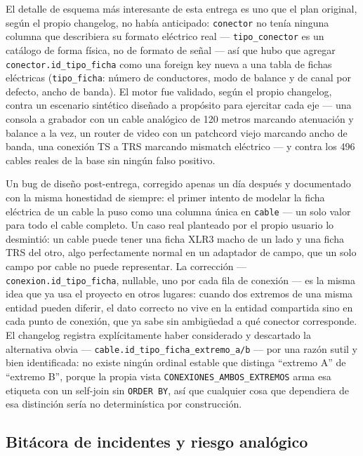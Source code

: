 \documentclass[11pt,twocolumn]{article}
\begin{document}
El detalle de esquema más interesante de esta entrega es uno que el plan original, según el propio changelog, no había anticipado: \texttt{conector} no tenía ninguna columna que describiera su formato eléctrico real --- \texttt{tipo\_conector} es un catálogo de forma física, no de formato de señal --- así que hubo que agregar \texttt{conector.id\_tipo\_ficha} como una foreign key nueva a una tabla de fichas eléctricas (\texttt{tipo\_ficha}: número de conductores, modo de balance y de canal por defecto, ancho de banda). El motor fue validado, según el propio changelog, contra un escenario sintético diseñado a propósito para ejercitar cada eje --- una consola a grabador con un cable analógico de 120 metros marcando atenuación y balance a la vez, un router de video con un patchcord viejo marcando ancho de banda, una conexión TS a TRS marcando mismatch eléctrico --- y contra los 496 cables reales de la base sin ningún falso positivo.

Un bug de diseño post-entrega, corregido apenas un día después y documentado con la misma honestidad de siempre: el primer intento de modelar la ficha eléctrica de un cable la puso como una columna única en \texttt{cable} --- un solo valor para todo el cable completo. Un caso real planteado por el propio usuario lo desmintió: un cable puede tener una ficha XLR3 macho de un lado y una ficha TRS del otro, algo perfectamente normal en un adaptador de campo, que un solo campo por cable no puede representar. La corrección --- \texttt{conexion.id\_tipo\_ficha}, nullable, uno por cada fila de conexión --- es la misma idea que ya usa el proyecto en otros lugares: cuando dos extremos de una misma entidad pueden diferir, el dato correcto no vive en la entidad compartida sino en cada punto de conexión, que ya sabe sin ambigüedad a qué conector corresponde. El changelog registra explícitamente haber considerado y descartado la alternativa obvia --- \texttt{cable.id\_tipo\_ficha\_extremo\_a/b} --- por una razón sutil y bien identificada: no existe ningún ordinal estable que distinga ``extremo A'' de ``extremo B'', porque la propia vista \texttt{CONEXIONES\_AMBOS\_EXTREMOS} arma esa etiqueta con un self-join sin \texttt{ORDER BY}, así que cualquier cosa que dependiera de esa distinción sería no determinística por construcción.

\subsection{Bitácora de incidentes y riesgo analógico}
\end{document}
